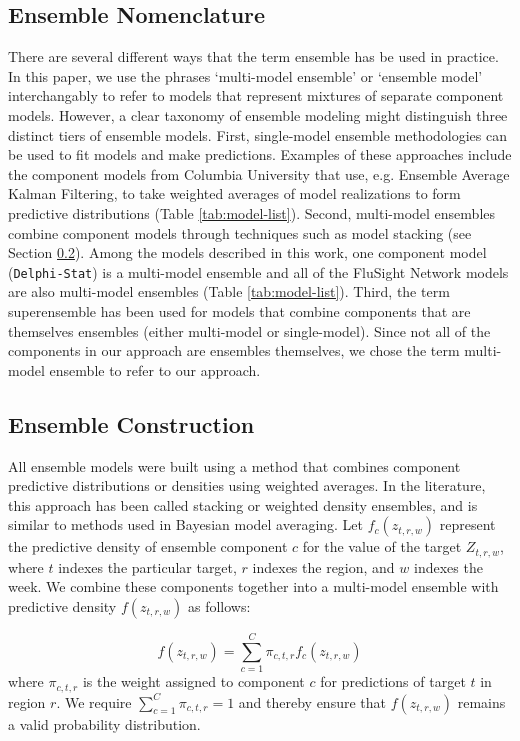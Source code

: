 \documentclass{article}\usepackage[]{graphicx}\usepackage[]{color}
\begin{document}
\subsection{Ensemble Nomenclature}

There are several different ways that the term ensemble has be used in practice. 
In this paper, we use the phrases `multi-model ensemble' or `ensemble model' interchangably to refer to models that represent mixtures of separate component models. 
However, a clear taxonomy of ensemble modeling might distinguish three distinct tiers of ensemble models. 
First, single-model ensemble methodologies can be used to fit models and make predictions. 
Examples of these approaches include the component models from Columbia University that use, e.g. Ensemble Average Kalman Filtering, to take weighted averages of model realizations to form predictive distributions (Table \ref{tab:model-list}).
Second, multi-model ensembles combine component models through techniques such as model stacking (see Section \ref{sec:stacking}).
Among the models described in this work, one component model ({\tt Delphi-Stat}) is a multi-model ensemble and all of the FluSight Network models are also multi-model ensembles (Table \ref{tab:model-list}).
Third, the term superensemble has been used for models that combine components that are themselves ensembles (either multi-model or single-model)\cite{krishnamurti1999improved,Yamana2016}.
Since not all of the components in our approach are ensembles themselves, we chose the term multi-model ensemble to refer to our approach.

\subsection{Ensemble Construction} \label{sec:stacking}

All ensemble models were built using a method that combines component predictive distributions or densities using weighted averages. In the literature, this approach has been called stacking\cite{Wolpert1992} or weighted density ensembles\cite{Ray2018}, and is similar to methods used in Bayesian model averaging\cite{Raftery2005}. Let $f_c(z_{t,r,w})$ represent the predictive density of ensemble component $c$ for the value of the target $Z_{t,r,w}$, where $t$ indexes the particular target, $r$ indexes the region, and $w$ indexes the week. We combine these components together into a multi-model ensemble with predictive density $f(z_{t,r,w})$ as follows:

\begin{equation}
f(z_{t,r,w})  = \sum^C_{c = 1} \pi_{c,t,r} f_c(z_{t,r,w})
\label{eq:enseq}
\end{equation}
where $\pi_{c, t, r}$ is the weight assigned to component $c$ for predictions of target $t$ in region $r$. We require $\sum^C_{c = 1} \pi_{c,t,r} = 1$ and thereby ensure that $f(z_{t,r,w})$ remains a valid probability distribution. 
\end{document}

